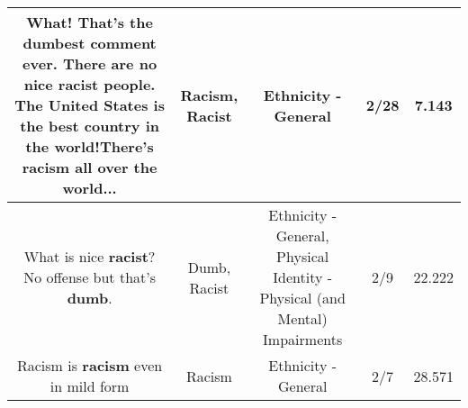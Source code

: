 \documentclass[11pt]{article}
\newlength\mylength
\begin{document}
\begin{center}
\begin{longtable}{|C{.65\mylength}|C{.30\mylength}|C{.12\mylength}|C{.12\mylength}|C{.12\mylength}|}
  \small What! That's the dumbest comment ever. There are no nice \textbf{racist} people. The United States is the best country in the world!There's \textbf{racism} all over the world...\normalsize   & Racism, Racist & Ethnicity - General & 2/28 & 7.143 \\  \hline
  \small What is nice \textbf{racist}? No offense but that's \textbf{dumb}.\normalsize   & Dumb, Racist & Ethnicity - General, Physical Identity - Physical (and Mental) Impairments & 2/9 & 22.222 \\  \hline
  \small Racism is \textbf{racism} even in mild form\normalsize   & Racism & Ethnicity - General & 2/7 & 28.571 \\  \hline
  
\end{longtable}
\end{center}
\end{document}
